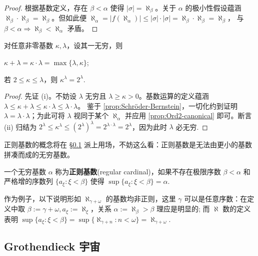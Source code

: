 \begin{proof}
	根据基数定义，存在 $\beta < \alpha$ 使得 $|\sigma| = \aleph_\beta$。关于 $\alpha$ 的极小性假设蕴涵 $\aleph_\beta \cdot \aleph_\beta = \aleph_\beta$。但如此便 $\aleph_\alpha = |f(\aleph_\alpha)| \leqslant |\sigma| \cdot |\sigma| = \aleph_\beta \cdot \aleph_\beta = \aleph_\beta$，
	与 $\beta < \alpha \Rightarrow \aleph_\beta < \aleph_\alpha$ 矛盾。
\end{proof}

\begin{corollary}\label{prop:cardinal-max}
	对任意非零基数 $\kappa,\lambda$，设其一无穷，则
	\begin{inparaenum}[(i)]
		\item $\kappa + \lambda = \kappa \cdot \lambda = \max\{\lambda,\kappa\}$;
		\item 若 $2 \leqslant \kappa \leqslant \lambda$，则 $\kappa^\lambda = 2^\lambda$.
	\end{inparaenum}
\end{corollary}
\begin{proof}
	先证 (i)。不妨设 $\lambda$ 无穷且 $\lambda \geqslant \kappa > 0$。基数运算的定义蕴涵 $\lambda \leqslant \kappa + \lambda \leqslant \kappa \cdot \lambda \leqslant \lambda \cdot \lambda$。
	鉴于 \ref{prop:Schröder-Bernstein}，一切化约到证明 $\lambda = \lambda \cdot \lambda$；为此可将 $\lambda$ 视同于某个 $\aleph_\alpha$ 并应用 \ref{prop:Ord2-canonical} 即可。断言 (ii) 归结为 $2^\lambda \leqslant \kappa^\lambda \leqslant (2^{\lambda})^\lambda = 2^{\lambda \cdot \lambda} = 2^\lambda$，因为此时 $\lambda$ 必无穷.
\end{proof}

正则基数的概念将在 \S\ref{sec:Grot-universe} 派上用场，不妨这么看：正则基数是无法由更小的基数拼凑而成的无穷基数。
\begin{definition}\label{def:regular-cardinal}
	一个无穷基数 $\alpha$ 称为\textbf{正则基数}(regular cardinal)，如果不存在极限序数 $\beta < \alpha$ 和严格增的序数列 $\{ a_\xi : \xi < \beta \}$ 使得 $\sup \{a_\xi : \xi < \beta\} = \alpha$.
\end{definition}

作为例子，以下说明形如 $\aleph_{\gamma+\omega}$ 的基数均非正则，这里 $\gamma$ 可以是任意序数：在定义中取 $\beta := \gamma + \omega, a_\xi := \aleph_\xi$，关系 $\alpha := \aleph_\beta > \beta$ 理应是明显的; 而 $\aleph$ 数的定义表明 $\sup \{ a_\xi : \xi < \beta \} = \sup \{ \aleph_{\gamma + n} : n < \omega \} = \aleph_{\gamma+\omega}$.

\subsection{Grothendieck 宇宙}\label{sec:Grot-universe}

